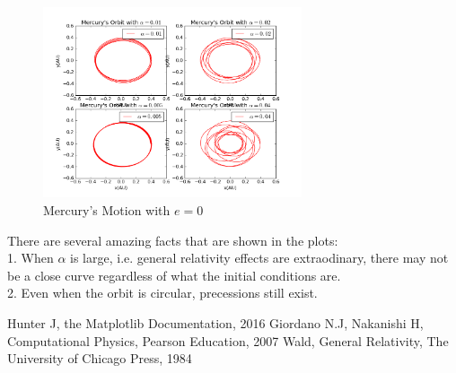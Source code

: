 \documentclass[10pt,a4paper]{article}
\begin{document}
    \begin{figure}[htbp!]
    	\centering
    	\includegraphics[width=3in]{Mercury_7.png}
    	\caption{Mercury's Motion with $e=0$}
    \end{figure}
    There are several amazing facts that are shown in the plots:\\
    1. When $\alpha$ is large, i.e. general relativity effects are extraodinary, there may not be a close curve regardless of what the initial conditions are.\\
    2. Even when the orbit is circular, precessions still exist.
    
    \begin{thebibliography}{99}
    	\bibitem{}Hunter J, the Matplotlib Documentation, 2016
    	\bibitem{}Giordano N.J, Nakanishi H, Computational Physics, Pearson Education, 2007
    	\bibitem{}Wald, General Relativity, The University of Chicago Press, 1984
    \end{thebibliography}
\end{document}
